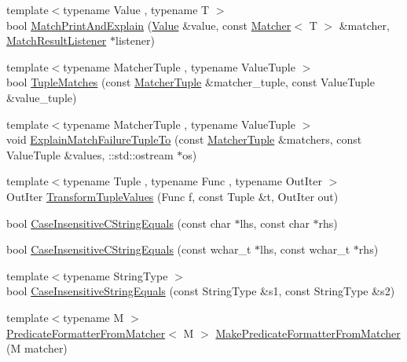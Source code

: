 \begin{DoxyCompactItemize}
\item 
{\footnotesize template$<$typename Value , typename T $>$ }\\bool \hyperlink{namespacetesting_1_1internal_a0821df2611d54c79bac990719ad8a2dd}{Match\+Print\+And\+Explain} (\hyperlink{namespacetesting_ae44c50a3a7f0a46f05c8a0b0592b4a62}{Value} \&value, const \hyperlink{classtesting_1_1_matcher}{Matcher}$<$ T $>$ \&matcher, \hyperlink{classtesting_1_1_match_result_listener}{Match\+Result\+Listener} $\ast$listener)
\item 
{\footnotesize template$<$typename Matcher\+Tuple , typename Value\+Tuple $>$ }\\bool \hyperlink{namespacetesting_1_1internal_a10095d1e1c99369200072b39d657ebc4}{Tuple\+Matches} (const \hyperlink{structtesting_1_1internal_1_1_matcher_tuple}{Matcher\+Tuple} \&matcher\+\_\+tuple, const Value\+Tuple \&value\+\_\+tuple)
\item 
{\footnotesize template$<$typename Matcher\+Tuple , typename Value\+Tuple $>$ }\\void \hyperlink{namespacetesting_1_1internal_afd62fd8914a7fae1bfc8a314fcc81f22}{Explain\+Match\+Failure\+Tuple\+To} (const \hyperlink{structtesting_1_1internal_1_1_matcher_tuple}{Matcher\+Tuple} \&matchers, const Value\+Tuple \&values, \+::std\+::ostream $\ast$os)
\item 
{\footnotesize template$<$typename Tuple , typename Func , typename Out\+Iter $>$ }\\Out\+Iter \hyperlink{namespacetesting_1_1internal_a07ba091a64aa2ba95e41accc55dc8855}{Transform\+Tuple\+Values} (Func f, const Tuple \&t, Out\+Iter out)
\item 
bool \hyperlink{namespacetesting_1_1internal_aebfd0cd34de52d7973a5b2d03ba848cf}{Case\+Insensitive\+C\+String\+Equals} (const char $\ast$lhs, const char $\ast$rhs)
\item 
bool \hyperlink{namespacetesting_1_1internal_ad5b31f61a3cc5b4226d3560f5b48f4dd}{Case\+Insensitive\+C\+String\+Equals} (const wchar\+\_\+t $\ast$lhs, const wchar\+\_\+t $\ast$rhs)
\item 
{\footnotesize template$<$typename String\+Type $>$ }\\bool \hyperlink{namespacetesting_1_1internal_a383de24b1cca6648c14b03964c0ed843}{Case\+Insensitive\+String\+Equals} (const String\+Type \&s1, const String\+Type \&s2)
\item 
{\footnotesize template$<$typename M $>$ }\\\hyperlink{classtesting_1_1internal_1_1_predicate_formatter_from_matcher}{Predicate\+Formatter\+From\+Matcher}$<$ M $>$ \hyperlink{namespacetesting_1_1internal_a3fd0f30ec03d577bba3e1aa13241e17d}{Make\+Predicate\+Formatter\+From\+Matcher} (M matcher)

\end{DoxyCompactItemize}
